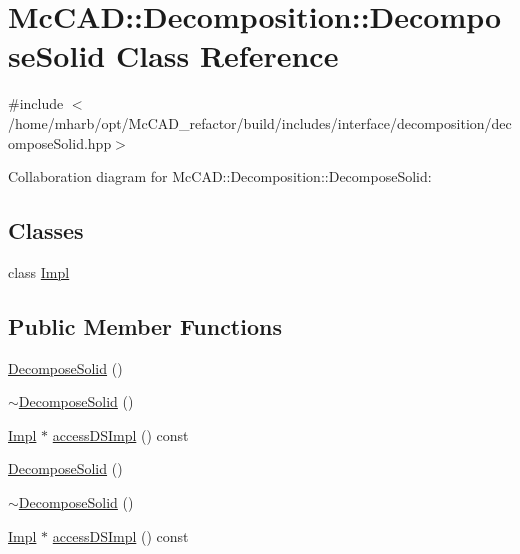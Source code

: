 \hypertarget{classMcCAD_1_1Decomposition_1_1DecomposeSolid}{}\section{Mc\+C\+AD\+:\+:Decomposition\+:\+:Decompose\+Solid Class Reference}
\label{classMcCAD_1_1Decomposition_1_1DecomposeSolid}


{\ttfamily \#include $<$/home/mharb/opt/\+Mc\+C\+A\+D\+\_\+refactor/build/includes/interface/decomposition/decompose\+Solid.\+hpp$>$}



Collaboration diagram for Mc\+C\+AD\+:\+:Decomposition\+:\+:Decompose\+Solid\+:
\subsection*{Classes}
\begin{DoxyCompactItemize}
\item 
class \hyperlink{classMcCAD_1_1Decomposition_1_1DecomposeSolid_1_1Impl}{Impl}
\end{DoxyCompactItemize}
\subsection*{Public Member Functions}
\begin{DoxyCompactItemize}
\item 
\hyperlink{classMcCAD_1_1Decomposition_1_1DecomposeSolid_a667ae32abac46338589582ab37623f6f}{Decompose\+Solid} ()
\item 
\hyperlink{classMcCAD_1_1Decomposition_1_1DecomposeSolid_ac8c691a04b01f5238acc8600255f2f46}{$\sim$\+Decompose\+Solid} ()
\item 
\hyperlink{classMcCAD_1_1Decomposition_1_1DecomposeSolid_1_1Impl}{Impl} $\ast$ \hyperlink{classMcCAD_1_1Decomposition_1_1DecomposeSolid_a383aaca9d5154e88862f948fff1d527a}{access\+D\+S\+Impl} () const
\item 
\hyperlink{classMcCAD_1_1Decomposition_1_1DecomposeSolid_a667ae32abac46338589582ab37623f6f}{Decompose\+Solid} ()
\item 
\hyperlink{classMcCAD_1_1Decomposition_1_1DecomposeSolid_ac8c691a04b01f5238acc8600255f2f46}{$\sim$\+Decompose\+Solid} ()
\item 
\hyperlink{classMcCAD_1_1Decomposition_1_1DecomposeSolid_1_1Impl}{Impl} $\ast$ \hyperlink{classMcCAD_1_1Decomposition_1_1DecomposeSolid_af9a2b1b8d7aa268f5ef6d4240619cf0e}{access\+D\+S\+Impl} () const
\end{DoxyCompactItemize}
